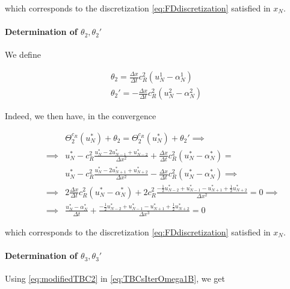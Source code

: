 \noindent which corresponds to the discretization \eqref{eq:FDdiscretization} satisfied in $x_N$. 

\paragraph{Determination of $\theta_2, \theta_2'$}

\indent We define

\begin{equation}
\begin{gathered}
    \theta_2 = \frac{\Delta x}{\Delta t} c_R^2 (u_N^1 - \alpha_N^1) \\
    \theta_2' = -\frac{\Delta x}{\Delta t} c_R^2 (u_N^2 - \alpha_N^2)
\end{gathered}
\end{equation}

\indent Indeed, we then have, in the convergence

\begin{equation}
\label{eq:modifiedTBC2}
\begin{aligned}
&& &\Theta_2^{c_R}(u_N^*) + \theta_2 = \Theta_2^{c_R}(u_N^*) + \theta_2'\implies \\
&& \implies & u_N^* - c_R^2 \frac{u_N^* - 2u_{N-1}^* + u_{N-2}^*}{\Delta x^2} + \frac{\Delta x}{\Delta t} c_R^2 (u_N^* - \alpha_N^*)  = \\ && & u_N^* - c_R^2 \frac{u_N^* - 2u_{N+1}^* + u_{N+2}^*}{\Delta x^2} -\frac{\Delta x}{\Delta t} c_R^2 (u_N^* - \alpha_N^*) \implies \\
&& \implies & 2\frac{\Delta x}{\Delta t} c_R^2 (u_N^* - \alpha_N^*) + 2c_R^2 \frac{-\frac{1}{2}u_{N-2}^* + u_{N-1}^* - u_{N+1}^* + \frac{1}{2}u_{N+2}^* }{\Delta x^2} = 0  \implies \\
&& \implies &\frac{u_N^* - \alpha_N^*}{\Delta t} + \frac{-\frac{1}{2}u_{N-2}^* + u_{N-1}^* - u_{N+1}^* + \frac{1}{2}u_{N+2}^* }{\Delta x^3} = 0
\end{aligned}
\end{equation}

\noindent which corresponds to the discretization \eqref{eq:FDdiscretization} satisfied in $x_N$.


\paragraph{Determination of $\theta_3, \theta_3'$}

\indent Using \eqref{eq:modifiedTBC2} in \eqref{eq:TBCsIterOmega1B}, we get


